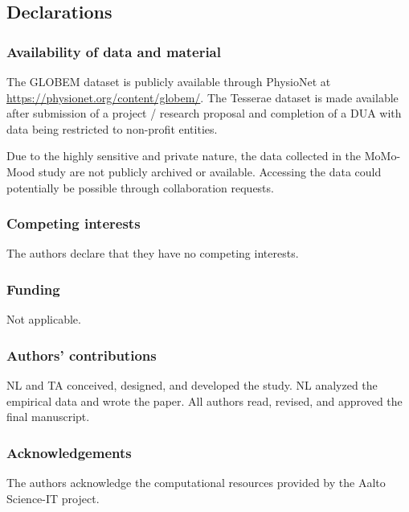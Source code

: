 \documentclass[pdflatex,sn-vancouver,Numbered]{bst/sn-jnl}%
\theoremstyle{thmstyleone}%
\theoremstyle{thmstyletwo}%
\theoremstyle{thmstylethree}%
\begin{document}
\newpage

\subsection*{Declarations}

\subsubsection*{Availability of data and material}

The GLOBEM dataset is publicly available through PhysioNet at \url{https://physionet.org/content/globem/}. The Tesserae dataset is made available after submission of a project / research proposal and completion of a DUA with data being restricted to non-profit entities.

Due to the highly sensitive and private nature, the data collected in the MoMo-Mood study are not publicly archived or available. Accessing the data could potentially be possible through collaboration requests.

\subsubsection*{Competing interests}

The authors declare that they have no competing interests.

\subsubsection*{Funding}

Not applicable.

\subsubsection*{Authors' contributions}

NL and TA conceived, designed, and developed the study. NL analyzed the empirical data and wrote the paper. All authors read, revised, and approved the final manuscript.

\subsubsection*{Acknowledgements}

The authors acknowledge the computational resources provided by the Aalto Science-IT project. 


\clearpage

\end{document}
